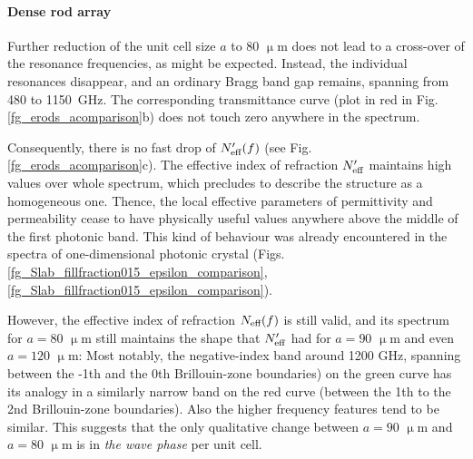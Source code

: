 \paragraph{Dense rod array} %
Further reduction of the unit cell size $a$ to 80 $\upmu$m does not lead to a cross-over of the resonance frequencies, as might be expected. Instead, the individual resonances disappear, and an ordinary Bragg band gap remains, spanning from 480 to 1150~GHz. The corresponding transmittance curve  (plot in red in Fig. \ref{fg_erods_acomparison}b) does not touch zero anywhere in the spectrum. 

Consequently, there is no fast drop of $N_{\text{eff} }'(f)$ (see Fig. \ref{fg_erods_acomparison}c). The effective index of refraction $N_{\text{eff} }'$ maintains high values over whole spectrum, which precludes to describe the structure as a homogeneous one. Thence, the local effective parameters of permittivity and permeability cease to have physically useful values anywhere above the middle of the first photonic band.
This kind of behaviour was already encountered in the spectra of one-dimensional photonic crystal (Figs. \ref{fg_Slab_fillfraction015_epsilon_comparison}, \ref{fg_Slab_fillfraction015_epsilon_comparison}). 

However, the effective index of refraction $N_{\text{eff} }(f)$ is still valid, and its spectrum for $a=80$ $\upmu$m still maintains the shape that $N_{\text{eff} }'$ had for $a=90$ $\upmu$m and even $a=120$ $\upmu$m: Most notably, the negative-index band around 1200 GHz, spanning between the -1th and the 0th Brillouin-zone boundaries) on the green curve has its analogy in a similarly narrow band on the red curve (between the 1th to the 2nd Brillouin-zone boundaries). Also the higher frequency features tend to be similar. This suggests that the only qualitative change between $a=90$ $\upmu$m and $a=80$ $\upmu$m is in \textit{the wave phase} per unit cell.

